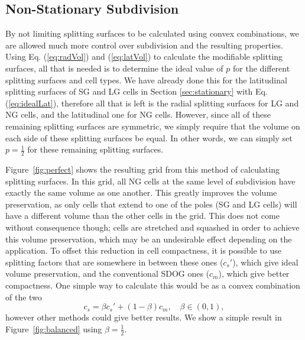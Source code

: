 \subsection{Non-Stationary Subdivision} \label{sec:nonStationary}
By not limiting splitting surfaces to be calculated using convex combinations, we are allowed much more control over subdivision and the resulting properties. Using Eq. (\ref{eq:radVol}) and (\ref{eq:latVol}) to calculate the modifiable splitting surfaces, all that is needed is to determine the ideal value of $p$ for the different splitting surfaces and cell types. We have already done this for the latitudinal splitting surfaces of SG and LG cells in Section \ref{sec:stationary} with Eq. (\ref{eq:idealLat}), therefore all that is left is the radial splitting surfaces for LG and NG cells, and the latitudinal one for NG cells. However, since all of these remaining splitting surfaces are symmetric, we simply require that the volume on each side of these splitting surfaces be equal. In other words, we can simply set $p = \frac{1}{2}$ for these remaining splitting surfaces. 




Figure~\ref{fig:perfect} shows the resulting grid from this method of calculating splitting surfaces. In this grid, all NG cells at the same level of subdivision have exactly the same volume as one another. This greatly improves the volume preservation, as only cells that extend to one of the poles (SG and LG cells) will have a different volume than the other cells in the grid. This does not come without consequence though; cells are stretched and squashed in order to achieve this volume preservation, which may be an undesirable effect depending on the application. To offset this reduction in cell compactness, it is possible to use splitting factors that are somewhere in between these ones ($c_{s}'$), which give ideal volume preservation, and the conventional SDOG ones ($c_{m}$), which give better compactness. One simple way to calculate this would be as a convex combination of the two
%
\begin{equation}
c_{s} = \beta c_{s}' + \left( 1 - \beta \right)c_{m}, \quad \beta \in \left( 0,1 \right),
\label {eq:beta}
\end{equation}
%
however other methods could give better results. We show a simple result in Figure~\ref{fig:balanced} using $\beta = \frac{1}{2}$. 



